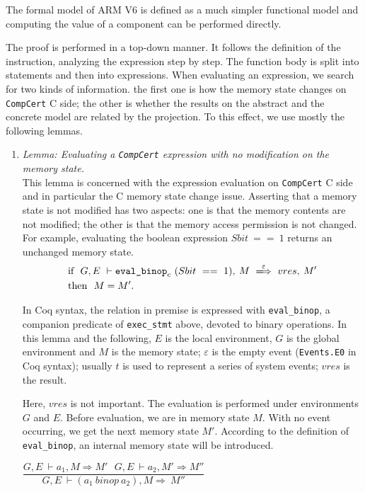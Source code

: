 \documentclass[twocolumn]{article}
\newcommand{\compcert}{\texttt{CompCert}\xspace}
\begin{document}
The formal model of ARM V6 is defined as a much simpler functional
model and computing the value of a component can be performed
directly.

The proof is performed in a top-down manner. It follows the definition
of the instruction, analyzing the expression step by step.  The
function body is split into statements and then into expressions.
When evaluating an expression, we search for two kinds of information.
the first one is how the memory state changes on \compcert C side; the other is
whether the results on the abstract and the concrete model are related
by the projection. To this effect, we use mostly the following lemmas.

\begin{enumerate}
\item
  \textit{Lemma: Evaluating a \compcert expression with no modification on the memory state.}\\
  This lemma is concerned with the expression evaluation on \compcert
  C side and in particular the C memory state change issue.  Asserting
  that a memory state is not modified has two aspects: one is that the
  memory contents are not modified; the other is that the memory
  access permission is not changed.  For example, evaluating the
  boolean expression $Sbit~==~1$ returns an unchanged memory state.
\begin{align*}
&\textrm{if}~~ G,E~\vdash \texttt{eval\_binop}_c~(Sbit~==~1),\:M~\xLongrightarrow{\varepsilon}~vres,\:M'\\
&\textrm{then}~~ M=M'.
\end{align*}

In Coq syntax, the relation in premise is expressed with
\texttt{eval\_binop}, a companion predicate of \texttt{exec\_stmt}
above, devoted to binary operations.  In this lemma and the following,
$E$ is the local environment, $G$ is the global environment and $M$ is
the memory state; $\varepsilon$ is the empty event (\texttt{Events.E0}
in Coq syntax); usually $t$ is used to represent a series of system
events; $vres$ is the result.

Here, $vres$ is not important.  The evaluation is performed under
environments $G$ and $E$.  Before evaluation, we are in memory state
$M$.  With no event occurring, we get the next memory state
$M'$. According to the definition of \texttt{eval\_binop},
an internal memory state will be introduced.\\
\begin{center}
$\dfrac
{G,E~\vdash a_1,M\Rightarrow M'~~~G,E~\vdash a_2,M'\Rightarrow M''
}
{G,E~\vdash (a_1~binop~a_2),M\Rightarrow~M''}$
\end{center}


\end{enumerate}
\end{document}
